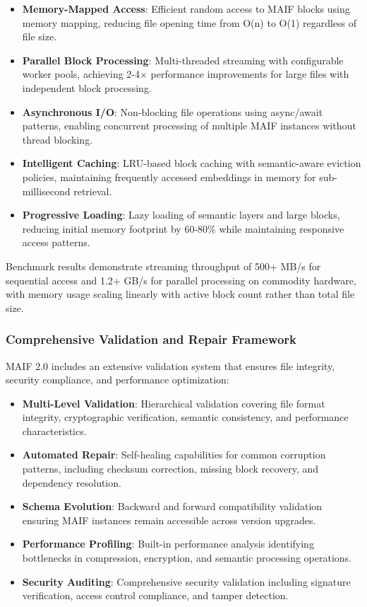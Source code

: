 \documentclass[conference]{IEEEtran}
\begin{document}
\begin{itemize}[leftmargin=*]
\item \textbf{Memory-Mapped Access}: Efficient random access to MAIF blocks using memory mapping, reducing file opening time from O(n) to O(1) regardless of file size.
\item \textbf{Parallel Block Processing}: Multi-threaded streaming with configurable worker pools, achieving 2-4× performance improvements for large files with independent block processing.
\item \textbf{Asynchronous I/O}: Non-blocking file operations using async/await patterns, enabling concurrent processing of multiple MAIF instances without thread blocking.
\item \textbf{Intelligent Caching}: LRU-based block caching with semantic-aware eviction policies, maintaining frequently accessed embeddings in memory for sub-millisecond retrieval.
\item \textbf{Progressive Loading}: Lazy loading of semantic layers and large blocks, reducing initial memory footprint by 60-80\% while maintaining responsive access patterns.
\end{itemize}

Benchmark results demonstrate streaming throughput of 500+ MB/s for sequential access and 1.2+ GB/s for parallel processing on commodity hardware, with memory usage scaling linearly with active block count rather than total file size.

\subsubsection{Comprehensive Validation and Repair Framework}

MAIF 2.0 includes an extensive validation system that ensures file integrity, security compliance, and performance optimization:

\begin{itemize}[leftmargin=*]
\item \textbf{Multi-Level Validation}: Hierarchical validation covering file format integrity, cryptographic verification, semantic consistency, and performance characteristics.
\item \textbf{Automated Repair}: Self-healing capabilities for common corruption patterns, including checksum correction, missing block recovery, and dependency resolution.
\item \textbf{Schema Evolution}: Backward and forward compatibility validation ensuring MAIF instances remain accessible across version upgrades.
\item \textbf{Performance Profiling}: Built-in performance analysis identifying bottlenecks in compression, encryption, and semantic processing operations.
\item \textbf{Security Auditing}: Comprehensive security validation including signature verification, access control compliance, and tamper detection.
\end{itemize}
\end{document}
